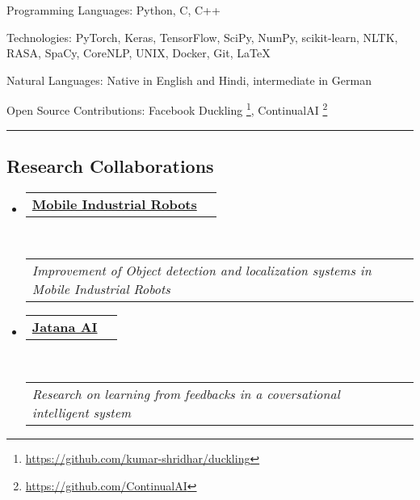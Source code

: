 \documentclass[10pt,letterpaper]{article}
\makeatletter
\newenvironment{indentsection}[1]%
{\begin{list}{}%
	{\setlength{\leftmargin}{#1}}%
	\item[]%
}
{\end{list}}
\newcommand{\headerrow}[2]
{\begin{tabular*}{\linewidth}{l@{\extracolsep{\fill}}r}
	#1 &
	#2 \\
\end{tabular*}}
\makeatother
\begin{document}
\begin{indentsection}{\parindent}
\begin{description*}
	\item[\color{BrickRed}Programming Languages:]
	Python, C, C++
	\item[\color{BrickRed}Technologies:]
	PyTorch, Keras, TensorFlow, SciPy, NumPy, scikit-learn, NLTK, RASA, SpaCy, CoreNLP, UNIX, Docker, Git, \LaTeX
	\item[\color{BrickRed}Natural Languages:]
	Native in English and Hindi, intermediate in German	
	\item[\color{BrickRed}Open Source Contributions:]
	Facebook Duckling \footnote{\url{ https://github.com/kumar-shridhar/duckling}}, ContinualAI \footnote{\url{https://github.com/ContinualAI}}
\end{description*}
\end{indentsection}

\hrule
\vspace{-0.4em}
\subsection*{\color{MidnightBlue} Research Collaborations}

\begin{itemize}
	\parskip=0.1em
	
	\item 
	\headerrow
		{\textbf{\href{http://www.mobile-industrial-robots.com/en/}{\color{BrickRed}Mobile Industrial Robots}}}
			{\textbf{}}
	\\
	\headerrow
		{\emph{\color{OliveGreen}Improvement of Object detection and localization systems in Mobile Industrial Robots}}
		{\emph{}}
	
    	\item 
	\headerrow
		{\textbf{\href{https://www.jatana.ai/}{\color{BrickRed}Jatana AI}}}
			{\textbf{}}
	\\
	\headerrow
		{\emph{\color{OliveGreen}Research on learning from feedbacks in a coversational intelligent system}}
		{\emph{}}
	
\end{itemize}
\end{document}
